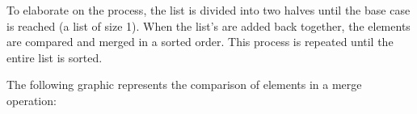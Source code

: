 \documentclass[12pt]{article}
\begin{document}
\begin{center}
\end{center}

To elaborate on the process, the list is divided into two halves until the base case is reached (a list of size 1).
When the list's are added back together, the elements are compared and merged in a sorted order.
This process is repeated until the entire list is sorted.

The following graphic represents the comparison of elements in a merge operation:
\end{document}
